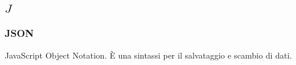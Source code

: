 \subsection*{\quad$J\quad$}
\subsubsection*{JSON}
JavaScript Object Notation. È una sintassi per il salvataggio e scambio di dati.

